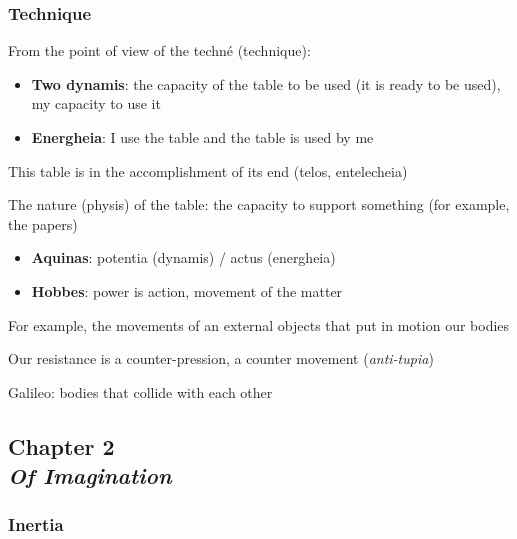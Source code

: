         \subsubsection{Technique}

            From the point of view of the techné (technique): 

            \begin{itemize}
                \item \textbf{Two dynamis}: the capacity of the table to be used (it is ready to be used), my capacity to use it
                \item \textbf{Energheia}: I use the table and the table is used by me
            \end{itemize}

            \begin{example}
                This table is in the accomplishment of its end (telos, entelecheia)
                
                The nature (physis) of the table: the capacity to support something (for example, the papers)
            \end{example}

            \begin{itemize}
                \item \textbf{Aquinas}: potentia (dynamis) / actus (energheia)
                \item \textbf{Hobbes}: power is action, movement of the matter
            \end{itemize}

            \begin{example}
                For example, the movements of an external objects that put in motion our bodies
            \end{example}

            Our resistance is a counter-pression, a counter movement (\textit{anti-tupia})

            Galileo: bodies that collide with each other

    \subsection[Of Imagination]{Chapter 2 \\ \textit{Of Imagination}}

        \subsubsection{Inertia}

